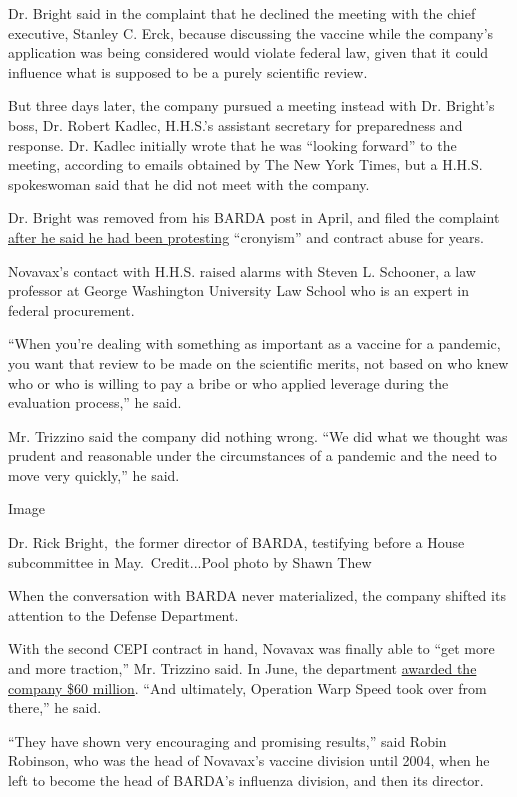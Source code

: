 Dr. Bright said in the complaint that he declined the meeting with the
chief executive, Stanley C. Erck, because discussing the vaccine while
the company's application was being considered would violate federal
law, given that it could influence what is supposed to be a purely
scientific review.

But three days later, the company pursued a meeting instead with Dr.
Bright's boss, Dr. Robert Kadlec, H.H.S.'s assistant secretary for
preparedness and response. Dr. Kadlec initially wrote that he was
``looking forward'' to the meeting, according to emails obtained by The
New York Times, but a H.H.S. spokeswoman said that he did not meet with
the company.

Dr. Bright was removed from his BARDA post in April, and filed the
complaint
\href{https://www.nytimes3xbfgragh.onion/2020/05/09/us/politics/whistle-blower-trump-coronavirus.html}{after
he said he had been protesting} ``cronyism'' and contract abuse for
years.

Novavax's contact with H.H.S. raised alarms with Steven L. Schooner, a
law professor at George Washington University Law School who is an
expert in federal procurement.

``When you're dealing with something as important as a vaccine for a
pandemic, you want that review to be made on the scientific merits, not
based on who knew who or who is willing to pay a bribe or who applied
leverage during the evaluation process,'' he said.

Mr. Trizzino said the company did nothing wrong. ``We did what we
thought was prudent and reasonable under the circumstances of a pandemic
and the need to move very quickly,'' he said.

Image

Dr. Rick Bright,~the former director of BARDA, testifying before a House
subcommittee in May.~Credit...Pool photo by Shawn Thew

When the conversation with BARDA never materialized, the company shifted
its attention to the Defense Department.

With the second CEPI contract in hand, Novavax was finally able to ``get
more and more traction,'' Mr. Trizzino said. In June, the department
\href{https://ir.novavax.com/news-releases/news-release-details/novavax-awarded-department-defense-contract-covid-19-vaccine}{awarded
the company \$60 million}. ``And ultimately, Operation Warp Speed took
over from there,'' he said.

``They have shown very encouraging and promising results,'' said Robin
Robinson, who was the head of Novavax's vaccine division until 2004,
when he left to become the head of BARDA's influenza division, and then
its director.

